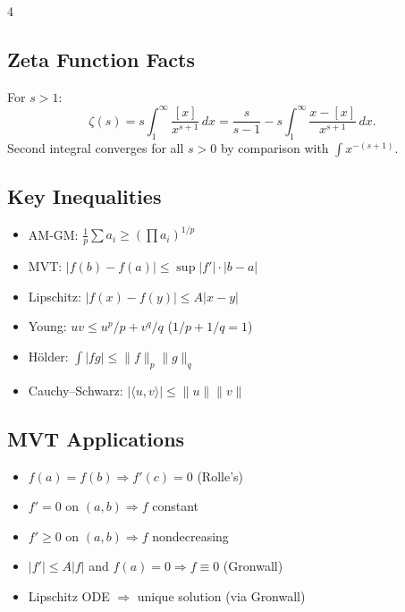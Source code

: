 \documentclass[9pt,landscape]{extarticle}
\theoremstyle{compact}
\begin{document}
\begin{multicols}{4}
\subsection{Zeta Function Facts}
For $s > 1$:
$$\zeta(s) = s\!\int_1^\infty \frac{[x]}{x^{s+1}}\,dx = \frac{s}{s-1} - s\!\int_1^\infty\frac{x-[x]}{x^{s+1}}\,dx.$$
Second integral converges for all $s > 0$ by comparison with $\int x^{-(s+1)}$.

\subsection{Key Inequalities}
\begin{itemize}
  \item AM-GM: $\frac{1}{p}\sum a_i \geq \left(\prod a_i\right)^{1/p}$
  \item MVT: $|f(b)-f(a)| \leq \sup|f'| \cdot |b-a|$
  \item Lipschitz: $|f(x)-f(y)| \leq A|x-y|$
  \item Young: $uv \leq u^p/p + v^q/q$ ($1/p+1/q=1$)
  \item H\"{o}lder: $\int|fg| \leq \|f\|_p\|g\|_q$
  \item Cauchy--Schwarz: $|\langle u,v\rangle| \leq \|u\|\|v\|$
\end{itemize}

\subsection{MVT Applications}
\begin{itemize}
  \item $f(a)=f(b) \Rightarrow f'(c)=0$ (Rolle's)
  \item $f'=0$ on $(a,b) \Rightarrow f$ constant
  \item $f'\geq 0$ on $(a,b) \Rightarrow f$ nondecreasing
  \item $|f'|\leq A|f|$ and $f(a)=0 \Rightarrow f\equiv 0$ (Gronwall)
  \item Lipschitz ODE $\Rightarrow$ unique solution (via Gronwall)
\end{itemize}

\end{multicols}
\end{document}
